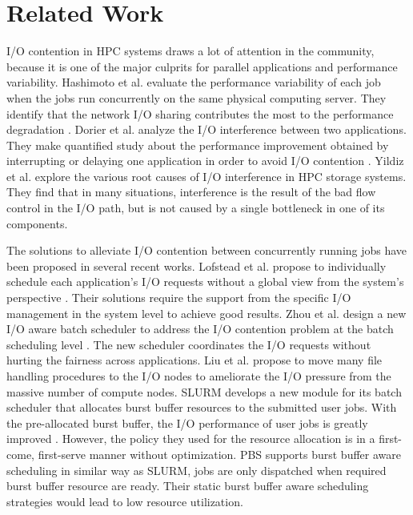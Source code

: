 \section{Related Work}
\label{Sec:RelatedWorks}

I/O contention in HPC systems draws a lot of attention in the community,
because it is one of the major culprits for parallel applications and performance variability.
Hashimoto et al. evaluate the performance variability of each job
when the jobs run concurrently on the same physical computing server.
They identify that the network I/O sharing contributes the most to
the performance degradation \cite{hashimoto:ICNC:2012}.
Dorier et al. analyze the I/O interference between two applications.
They make quantified study about the performance improvement obtained
by interrupting or delaying one application in order to avoid I/O contention \cite{dorier:IPDPS:2014}.
Yildiz et al. \cite{yildiz:IPDPS:2016} explore the various root causes
of I/O interference in HPC storage systems.
They find that in many situations, interference is the result of the bad flow control in the I/O path,
but is not caused by a single bottleneck in one of its components.

The solutions to alleviate I/O contention between concurrently
running jobs have been proposed in several recent works.
Lofstead et al. propose to individually schedule each application's I/O requests without
a global view from the system's perspective \cite{lofstead:sc:2010}.
Their solutions require the support from the specific I/O management
in the system level to achieve good results.
Zhou et al. design a new I/O aware batch scheduler to address the I/O
contention problem at the batch scheduling level \cite{zhou:Cluster:2015}.
The new scheduler coordinates the  I/O requests without hurting the fairness across applications.
Liu et al. propose to move many file handling procedures to the I/O nodes to
ameliorate the I/O pressure from the massive number of compute nodes\cite{Liu:MSST:2012}.
SLURM develops a new module for its batch scheduler that allocates burst buffer
resources to the submitted user jobs. With the pre-allocated burst buffer,
the I/O performance of user jobs is greatly improved \cite{SlurmBBGuide}.
However, the policy they used for the resource allocation is in a first-come, first-serve manner without optimization.
PBS supports burst buffer aware scheduling in similar way as SLURM, 
jobs are only dispatched when required burst buffer resource are ready\cite{PBSonCRAY}. 
Their static burst buffer aware scheduling strategies would lead to low resource utilization.


